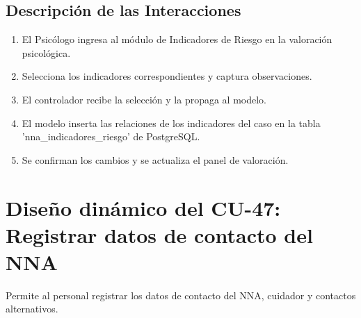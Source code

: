 \subsection{Descripción de las Interacciones}
\begin{enumerate}
    \item El Psicólogo ingresa al módulo de Indicadores de Riesgo en la valoración psicológica.
    \item Selecciona los indicadores correspondientes y captura observaciones.
    \item El controlador recibe la selección y la propaga al modelo.
    \item El modelo inserta las relaciones de los indicadores del caso en la tabla 'nna\_indicadores\_riesgo' de PostgreSQL.
    \item Se confirman los cambios y se actualiza el panel de valoración.
\end{enumerate}

\cleardoublepage
\section{Diseño dinámico del CU-47: Registrar datos de contacto del NNA}
\label{sec:disenoDinamicoCU47}

Permite al personal registrar los datos de contacto del NNA, cuidador y contactos alternativos.

